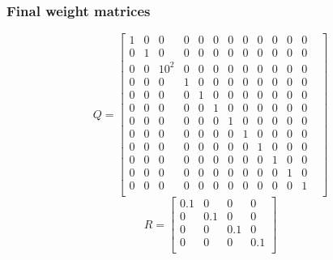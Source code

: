 \subsubsection{Final weight matrices}

$$
Q=\begin{bmatrix}
1 & 0 & 0 & 0 & 0 & 0 & 0 & 0 & 0 & 0 & 0 & 0 \\
0 & 1 & 0 & 0 & 0 & 0 & 0 & 0 & 0 & 0 & 0 & 0 \\
0 & 0 & 10^2 & 0 & 0 & 0 & 0 & 0 & 0 & 0 & 0 & 0 \\
0 & 0 & 0 & 1 & 0 & 0 & 0 & 0 & 0 & 0 & 0 & 0 \\
0 & 0 & 0 & 0 & 1 & 0 & 0 & 0 & 0 & 0 & 0 & 0 \\
0 & 0 & 0 & 0 & 0 & 1 & 0 & 0 & 0 & 0 & 0 & 0 \\
0 & 0 & 0 & 0 & 0 & 0 & 1 & 0 & 0 & 0 & 0 & 0 \\
0 & 0 & 0 & 0 & 0 & 0 & 0 & 1 & 0 & 0 & 0 & 0 \\
0 & 0 & 0 & 0 & 0 & 0 & 0 & 0 & 1 & 0 & 0 & 0  \\
0 & 0 & 0 & 0 & 0 & 0 & 0 & 0 & 0 & 1 & 0 & 0 & \\
0 & 0 & 0 & 0 & 0 & 0 & 0 & 0 & 0 & 0 & 1 & 0 & \\
0 & 0 & 0 & 0 & 0 & 0 & 0 & 0 & 0 & 0 & 0 & 1 & \\
\end{bmatrix}
$$
$$
R=\begin{bmatrix}
0.1 & 0 & 0 & 0 \\
0 & 0.1 & 0 & 0 \\
0 & 0 & 0.1 & 0 \\
0 & 0 & 0 & 0.1 \\
\end{bmatrix}
$$

